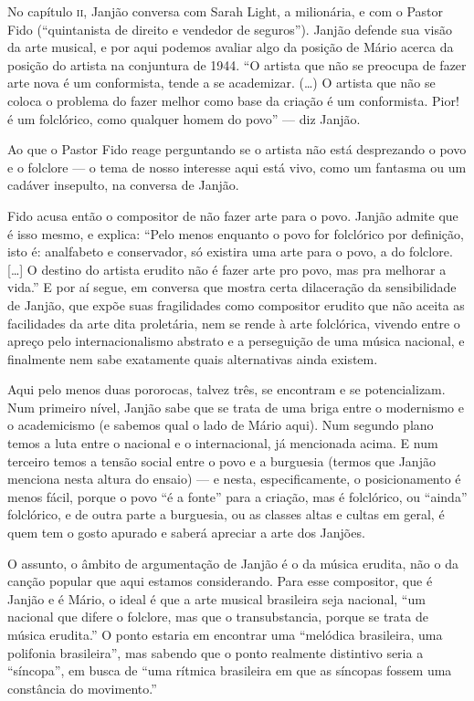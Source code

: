 No capítulo \textsc{ii}, Janjão conversa com Sarah Light, a milionária, e com o
Pastor Fido (``quintanista de direito e vendedor de seguros''). Janjão
defende sua visão da arte musical, e por aqui podemos avaliar algo da
posição de Mário acerca da posição do artista na conjuntura de 1944. ``O
artista que não se preocupa de fazer arte nova é um conformista, tende a
se academizar. (\ldots{}) O artista que não se coloca o problema do fazer
melhor como base da criação é um conformista. Pior! é um folclórico,
como qualquer homem do povo'' --- diz Janjão.

Ao que o Pastor Fido reage perguntando se o artista não está desprezando
o povo e o folclore --- o tema de nosso interesse aqui está vivo, como um
fantasma ou um cadáver insepulto, na conversa de Janjão.

Fido acusa então o compositor de não fazer arte para o povo. Janjão
admite que é isso mesmo, e explica: ``Pelo menos enquanto o povo for
folclórico por definição, isto é: analfabeto e conservador, só existira
uma arte para o povo, a do folclore. {[}\ldots{}{]} O destino do artista erudito
não é fazer arte pro povo, mas pra melhorar a vida.'' E por aí segue, em
conversa que mostra certa dilaceração da sensibilidade de Janjão, que
expõe suas fragilidades como compositor erudito que não aceita as
facilidades da arte dita proletária, nem se rende à arte folclórica,
vivendo entre o apreço pelo internacionalismo abstrato e a perseguição
de uma música nacional, e finalmente nem sabe exatamente quais
alternativas ainda existem.

Aqui pelo menos duas pororocas, talvez três, se encontram e se
potencializam. Num primeiro nível, Janjão sabe que se trata de uma briga
entre o modernismo e o academicismo (e sabemos qual o lado de Mário
aqui). Num segundo plano temos a luta entre o nacional e o
internacional, já mencionada acima. E num terceiro temos a tensão social
entre o povo e a burguesia (termos que Janjão menciona nesta altura do
ensaio) --- e nesta, especificamente, o posicionamento é menos fácil,
porque o povo ``é a fonte'' para a criação, mas é folclórico, ou
``ainda'' folclórico, e de outra parte a burguesia, ou as classes altas
e cultas em geral, é quem tem o gosto apurado e saberá apreciar a arte
dos Janjões.

O assunto, o âmbito de argumentação de Janjão é o da música erudita, não
o da canção popular que aqui estamos considerando. Para esse compositor,
que é Janjão e é Mário, o ideal é que a arte musical brasileira seja
nacional, ``um nacional que difere o folclore, mas que o transubstancia,
porque se trata de música erudita.'' O ponto estaria em encontrar uma
``melódica brasileira, uma polifonia brasileira'', mas sabendo que o
ponto realmente distintivo seria a ``síncopa'', em busca de ``uma
rítmica brasileira em que as síncopas fossem uma constância do
movimento.''

